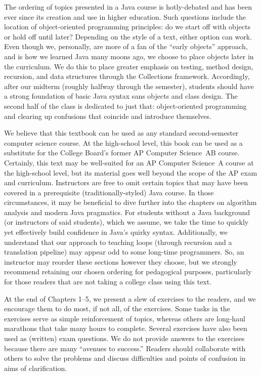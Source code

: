The ordering of topics presented in a Java course is hotly-debated and has been ever since its creation and use in higher education. 
Such questions include the location of object-oriented programming principles: do we start off with objects or hold off until later? 
Depending on the style of a text, either option can work. 
Even though we, personally, are more of a fan of the ``early objects'' approach, and is how we learned Java many moons ago, we choose to place objects later in the curriculum. 
We do this to place greater emphasis on testing, method design, recursion, and data structures through the Collections framework. 
Accordingly, after our midterm (roughly halfway through the semester), students should have a strong foundation of basic Java syntax sans objects and class design. 
The second half of the class is dedicated to just that: object-oriented programming and clearing up confusions that coincide and introduce themselves. 

We believe that this textbook can be used as any standard second-semester computer science course. 
At the high-school level, this book can be used as a substitute for the College Board's former AP Computer Science~AB course. 
Certainly, this text may be well-suited for an AP Computer Science~A course at the high-school level, but its material goes well beyond the scope of the AP exam and curriculum.
Instructors are free to omit certain topics that may have been covered in a prerequisite (traditionally-styled) Java course. 
In those circumstances, it may be beneficial to dive further into the chapters on algorithm analysis and modern Java pragmatics. 
For students without a Java background (or instructors of said students), which we assume, we take the time to quickly yet effectively build confidence in Java's quirky syntax. 
Additionally, we understand that our approach to teaching loops (through recursion and a translation pipeline) may appear odd to some long-time programmers. 
So, an instructor may reorder these sections however they choose, but we strongly recommend retaining our chosen ordering for pedagogical purposes, particularly for those readers that are not taking a college class using this text. 

At the end of Chapters 1--5, we present a slew of exercises to the readers, and we encourage them to do most, if not all, of the exercises.
Some tasks in the exercises serve as simple reinforcement of topics, whereas others are long-haul marathons that take many hours to complete. 
Several exercises have also been used as (written) exam questions.
We do not provide answers to the exercises because there are many ``avenues to success.''
Readers should collaborate with others to solve the problems and discuss difficulties and points of confusion in aims of clarification.


